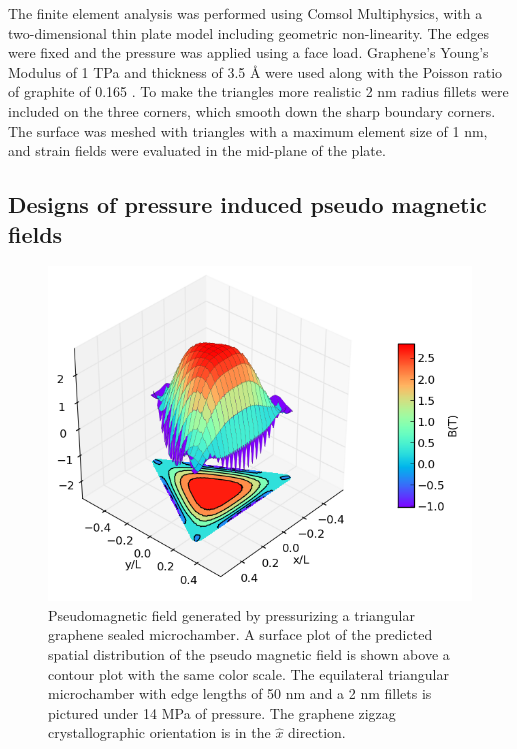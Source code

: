 The finite element analysis was performed using Comsol Multiphysics, with a two-dimensional thin plate model including geometric non-linearity.
The edges were fixed and the pressure was applied using a face load.
Graphene's Young's Modulus of 1 TPa and thickness of 3.5 \AA \cite{Lee2008} were used along with the Poisson ratio of graphite of 0.165 \cite{Blakslee1970}.
To make the triangles more realistic 2 nm radius fillets were included on the three corners, which smooth down the sharp boundary corners.
The surface was meshed with triangles with a maximum element size of 1 nm, and strain fields were evaluated in the mid-plane of the plate.

\subsection{Designs of pressure induced pseudo magnetic fields}
\begin{figure}
  \begin{center}
  \includegraphics[scale=.75]{Figs_PVP/Triangle_PMF.png}
  \end{center}
  \caption[Pseudomagnetic field generated by pressurizing a triangular graphene sealed microchamber]{\label{fig:PVP:triangle} Pseudomagnetic field generated by pressurizing a triangular graphene sealed microchamber. A surface plot of the predicted spatial distribution of the pseudo magnetic field is shown above a contour plot with the same color scale. The equilateral triangular microchamber with edge lengths of 50 nm and a 2 nm fillets is pictured under 14 MPa of pressure. The graphene zigzag crystallographic orientation is in the $\hat{x}$ direction.}
\end{figure}


